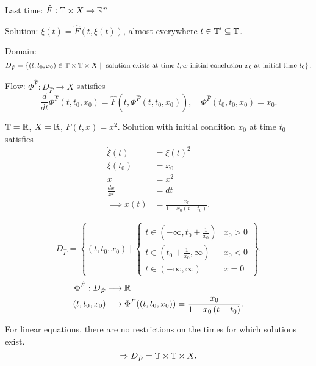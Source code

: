 
Last time: $\hat{F} : \mathbb{T} \times X  \to \mathbb{R}^{n}$ 

Solution: $\dot{\xi} \left( t \right) = \hat{F}\left( t, \xi \left( t \right)  \right) $, almost everywhere $t \in  \mathbb{T}' \subseteq \mathbb{T}$. 

Domain:
\[
D_{\hat{F}} = \left\{ \left( t, t_0, x_0 \right) \in \mathbb{T}\times \mathbb{T}\times X \\
\mid \text{ solution exists at time }t, w \text{ initial conclusion }x_0 \text{ at initial time } t_0\right\} 
.\] 

Flow: $\Phi ^{\hat{F}} : D_{\hat{F}} \to X$ satisfies 
\[
	\frac{d}{dt}\Phi ^{\hat{F}}\left( t, t_0, x_0 \right)  = \hat{F}\left( t, \Phi ^{\hat{F}}\left( t, t_0, x_0 \right)  \right) , \quad \Phi ^{\hat{F}}\left( t_0, t_0, x_0 \right)  = x_0
.\] 
\begin{example}
	$\mathbb{T} = \mathbb{R}$, $X = \mathbb{R}$, $\hat{F}\left( t, x \right) = x^2$. Solution with initial condition $x_0$ at time $t_0$ satisfies 
	\begin{align*}
		\dot{\xi }\left( t \right)  &=  \xi \left( t \right) ^2 \\
		\xi \left( t_0 \right) &= x_0 \\
		\dot{x} &= x^2 \\
		\frac{dx}{x^2} &= dt \\
		\implies x\left( t \right) &= \frac{x_0}{1 - x_0\left( t - t_0 \right) } 
	.\end{align*}

	\[
		D_{\hat{F}} = \left\{ \left( t, t_0, x_0 \right)  \mid \begin{cases}
				t \in \left( -\infty, t_0 + \frac{1}{x_0} \right) & x_0 > 0 \\
				t \in  \left( t_0 + \frac{1}{x_0}, \infty \right) & x_0 < 0 \\
				t \in  \left( -\infty, \infty \right)  & x = 0
		\end{cases} \right\} 
	.\] 
	\begin{align*}
		\Phi ^{\hat{F}}: D_{\hat{F}} &\longrightarrow \mathbb{R} \\
		\left( t, t_0, x_0 \right)  &\longmapsto \Phi ^{\hat{F}}(\left( t, t_0, x_0 \right) ) = \frac{x_0}{1 - x_0\left( t - t_0 \right) }
	.\end{align*}
\end{example}

For linear equations, there are no restrictions on the times for which solutions exist.
\[
\Rightarrow D_{\hat{F}} = \mathbb{T} \times  \mathbb{T} \times  X 
.\] 

